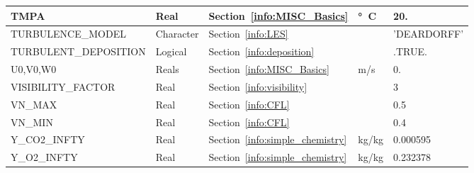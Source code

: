 \documentclass[11pt]{book}
\begin{document}
\begin{longtable}{@{\extracolsep{\fill}}|l|l|l|l|l|}
{\ct TMPA}                                      & Real          & Section~\ref{info:MISC_Basics}                        & \si{\degree C} & 20.               \\ \hline
{\ct TURBULENCE\_MODEL}                         & Character     & Section~\ref{info:LES}                                &               & {\ct 'DEARDORFF'} \\ \hline
{\ct TURBULENT\_DEPOSITION}                     & Logical       & Section~\ref{info:deposition}                         &               & {\ct .TRUE.}      \\ \hline
{\ct U0,V0,W0}                                  & Reals         & Section~\ref{info:MISC_Basics}                        & m/s           & 0.                \\ \hline
{\ct VISIBILITY\_FACTOR}                        & Real          & Section~\ref{info:visibility}                         &               & 3                 \\ \hline
{\ct VN\_MAX}                                   & Real          & Section~\ref{info:CFL}                                &               & 0.5               \\ \hline
{\ct VN\_MIN}                                   & Real          & Section~\ref{info:CFL}                                &               & 0.4               \\ \hline
{\ct Y\_CO2\_INFTY}                             & Real          & Section~\ref{info:simple_chemistry}                   &  kg/kg        & 0.000595          \\ \hline
{\ct Y\_O2\_INFTY}                              & Real          & Section~\ref{info:simple_chemistry}                   &  kg/kg        & 0.232378          \\ \hline
\end{longtable}
\end{document}

